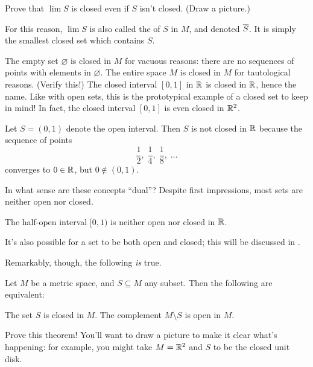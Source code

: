 \begin{exercise}
	Prove that $\lim S$ is closed even if $S$ isn't closed. (Draw a picture.)
\end{exercise}
For this reason, $\lim S$ is also called the  of $S$ in $M$,
and denoted $\overline S$.  It is simply the smallest closed set which contains $S$.

\begin{example}
	\listhack
	\begin{enumerate}[(a)]
		\ii The empty set $\varnothing$ is closed in $M$ for vacuous reasons:
		there are no sequences of points with elements in $\varnothing$.
		\ii The entire space $M$ is closed in $M$ for tautological reasons.
		(Verify this!)
		\ii The closed interval $[0,1]$ in $\mathbb R$ is closed in $\mathbb R$, hence the name.  Like with open sets, this is the prototypical example of a closed set to keep in mind!
		\ii In fact, the closed interval $[0,1]$ is even closed in $\mathbb R^2$.
	\end{enumerate}
\end{example}
\begin{example}
	Let $S=(0,1)$ denote the open interval.
	Then $S$ is not closed in $\mathbb R$
	because the sequence of points
	\[
		\frac12, \;
		\frac14, \;
		\frac18, \;
		\dots
	\]
	converges to $0 \in \mathbb R$, but $0 \notin (0,1)$.
\end{example}

In what sense are these concepts ``dual''?
Despite first impressions, most sets are neither open nor closed.
\begin{example}
	The half-open interval $[0,1)$ %
	is neither open nor closed in $\mathbb R$.
\end{example}
\begin{remark}
	It's also possible for a set to be both open and closed;
	this will be discussed in .
\end{remark}

Remarkably, though, the following \emph{is} true.
\begin{theorem}
	Let $M$ be a metric space, and $S \subseteq M$ any subset.
	Then the following are equivalent:
	\begin{itemize}
		\ii The set $S$ is closed in $M$.
		\ii The complement $M \setminus S$ is open in $M$.
	\end{itemize}
\end{theorem}
\begin{exercise}
	Prove this theorem!
	You'll want to draw a picture to make it clear what's happening: for example,
	you might take $M = \mathbb R^2$ and $S$ to be the closed unit disk.
\end{exercise}

